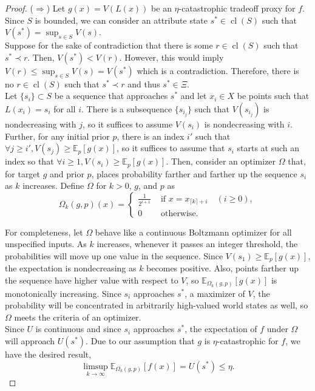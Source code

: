 \documentclass{article}
\DeclareMathOperator*{\cl}{cl}
\begin{document}
\badProxyExistsAttribute* \label{sec:badProxyExistsAttributesProof}
\begin{proof}
($\Longrightarrow$) Let $g(x) = V(L(x))$ be an $\eta$-catastrophic tradeoff proxy for $f$. Since $S$ is bounded, we can consider an attribute state $s^* \in \cl(S)$ such that $V(s^*) = \sup_{s \in S} V(s)$.\\

Suppose for the sake of contradiction that there is some $r \in \cl(S)$ such that $s^* \prec r$. Then, $V(s^*) < V(r)$. However, this would imply $V(r) \leq \sup_{s \in S} V(s) = V(s^*)$ which is a contradiction. Therefore, there is no $r \in \cl(S)$ such that $s^* \prec r$ and thus $s^* \in \Xi$.\\

Let $\{s_i\} \subset S$ be a sequence that approaches $s^*$ and let $x_i \in X$ be points such that $L(x_i) = s_i$ for all $i$. There is a subsequence $\{s_{i_j}\}$ such that $V(s_{i_j})$ is nondecreasing with $j$, so it suffices to assume $V(s_i)$ is nondecreasing with $i$. Further, for any initial prior $p$, there is an index $i'$ such that $\forall j \geq i', V(s_{j}) \geq \mathbb E_{p}[g(x)]$, so it suffices to assume that $s_i$ starts at such an index so that $\forall i \geq 1, V(s_i) \geq \mathbb E_p [g(x)]$. Then, consider an optimizer $\Omega$ that, for target $g$ and prior $p$, places probability farther and farther up the sequence $s_i$ as $k$ increases. Define $\Omega$ for $k>0$, $g$, and $p$ as
$$\Omega_k(g,p)(x) = \begin{cases}
\frac 1 {2^{i+1}} & \text{ if } x = x_{\lceil k \rceil+i} \quad (i \geq 0),\\
0 & \text{ otherwise.}
\end{cases}$$

For completeness, let $\Omega$ behave like a continuous Boltzmann optimizer for all unspecified inputs. As $k$ increases, whenever it passes an integer threshold, the probabilities will move up one value in the sequence. Since $V(s_1) \geq \mathbb E_p [g(x)]$, the expectation is nondecreasing as $k$ becomes positive. Also, points farther up the sequence have higher value with respect to $V$, so $\mathbb E_{\Omega_k (g,p)}[g(x)]$ is monotonically increasing. Since $s_i$ approaches $s^*$, a maximizer of $V$, the probability will be concentrated in arbitrarily high-valued world states as well, so $\Omega$ meets the criteria of an optimizer.\\

Since $U$ is continuous and since $s_i$ approaches $s^*$, the expectation of $f$ under $\Omega$ will approach $U(s^*)$. Due to our assumption that $g$ is $\eta$-catastrophic for $f$, we have the desired result,
$$\limsup_{k \rightarrow \infty} \mathbb E_{\Omega_k(g,p)}[f(x)] = U(s^*) \leq \eta.$$


\end{proof}
\end{document}
